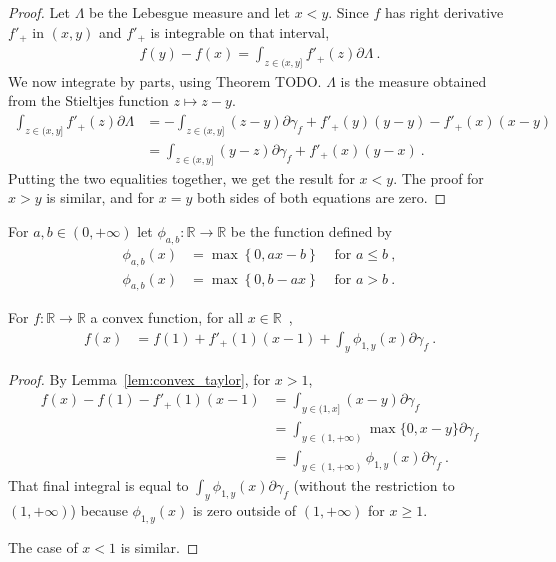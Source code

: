 \begin{proof}\leanok
\uses{}
Let $\Lambda$ be the Lebesgue measure and let $x < y$. Since $f$ has right derivative $f'_+$ in $(x,y)$ and $f'_+$ is integrable on that interval,
\begin{align*}
f(y) - f(x) = \int_{z \in (x, y]} f'_+(z) \partial \Lambda
\: .
\end{align*}
We now integrate by parts, using Theorem TODO. $\Lambda$ is the measure obtained from the Stieltjes function $z \mapsto z - y$.
\begin{align*}
\int_{z \in (x, y]} f'_+(z) \partial \Lambda
&= - \int_{z \in (x,y]} (z - y)\partial \gamma_f + f'_+(y)(y - y) - f'_+(x)(x - y)
\\
&= \int_{z \in (x,y]} (y - z)\partial \gamma_f + f'_+(x)(y - x)
\: .
\end{align*}
Putting the two equalities together, we get the result for $x < y$. The proof for $x > y$ is similar, and for $x = y$ both sides of both equations are zero.
\end{proof}


\begin{definition}
  \label{def:statInfoFun}
  \leanok
  \uses{}
  For $a,b \in (0, +\infty)$ let $\phi_{a,b} : \mathbb{R} \to \mathbb{R}$ be the function defined by
  \begin{align*}
  \phi_{a,b}(x) &= \max\left\{0, a x - b \right\} & \text{ for } a \le b \: ,
  \\
  \phi_{a,b}(x) &= \max\left\{0, b - a x \right\} & \text{ for } a > b \: .
  \end{align*}
\end{definition}


\begin{corollary}
  \label{cor:convex_taylor_statInfoFun}
  \leanok
  For $f: \mathbb{R} \to \mathbb{R}$ a convex function, for all $x \in \mathbb{R}$~,
  \begin{align*}
  f(x) &= f(1) + f'_+(1) (x - 1) + \int_{y} \phi_{1,y}(x) \partial\gamma_f \: .
  \end{align*}
\end{corollary}

\begin{proof}\leanok
{}
By Lemma~\ref{lem:convex_taylor}, for $x > 1$,
\begin{align*}
f(x) - f(1) - f'_+(1) (x - 1)
&= \int_{y \in (1, x]} (x - y) \partial\gamma_f
\\
&= \int_{y \in (1, +\infty)} \max\{0, x - y\} \partial\gamma_f
\\
&= \int_{y \in (1, +\infty)} \phi_{1,y}(x) \partial\gamma_f
\: .
\end{align*}
That final integral is equal to $\int_y \phi_{1,y}(x) \partial\gamma_f$ (without the restriction to $(1, +\infty)$) because $\phi_{1,y}(x)$ is zero outside of $(1, +\infty)$ for $x \ge 1$.

The case of $x < 1$ is similar.
\end{proof}


